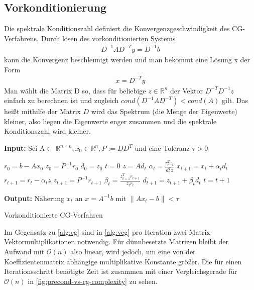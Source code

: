 \documentclass[12pt,a4paper]{scrartcl}
\numberwithin{equation}{section}
\numberwithin{myalgctr}{section}
\numberwithin{mytheoremctr}{subsection}
\numberwithin{mykorollarctr}{subsection}
\numberwithin{mylemmactr}{subsection}
\numberwithin{mybeispielctr}{subsection}
\newcommand\norm[1]{\left\lVert#1\right\rVert}
\begin{document}
	\subsection{Vorkonditionierung}
	Die spektrale Konditionszahl definiert die Konvergenzgeschwindigkeit des CG-Verfahrens. Durch lösen des vorkonditionierten Systems
	\begin{align*}
		D^{-1}AD^{-T}y = D^{-1}b
	\end{align*}
	kann die Konvergenz beschleunigt werden und man bekommt eine Lösung x der Form 
	\begin{align*}
		x = D^{-T}y
	\end{align*}
	Man wählt die Matrix D so, dass für beliebige $z \in \mathbb{R}^{n}$ der Vektor $D^{-T}D^{-1}z$ einfach zu berechnen ist und zugleich $cond(D^{-1}AD^{-T}) < cond(A)$ gilt. Das heißt mithilfe der Matrix $D$ wird das Spektrum (die Menge der Eigenwerte) kleiner, also liegen die Eigenwerte enger zusammen und die spektrale Konditionszahl wird kleiner. 
	\begin{algorithm}[H]
		\textbf{Input:} Sei A$\in$ $\mathbb{R}^{n\times n}, x_0 \in \mathbb{R}^{n}, P:=DD^{T}$ und eine Toleranz $\tau > 0$
		\begin{algorithmic}[1]
			\State $r_0 = b - Ax_0$
			\State $z_0 = P^{-1}r_0$
			\State $d_0 = z_0$
			\State $t = 0$
			\While{$ \norm{r_t} > \tau $}
			\State $z = Ad_t$
			\State $\alpha_t = \frac{r_t^{T}z_t}{d_t^{T}z}$
			\State $x_{t+1} = x_{t} + \alpha_t d_t$
			\State $r_{t+1} = r_t - \alpha_t z$
			\State $z_{t+1} = P^{-1}r_{t+1}$
			\State $\beta_t = \frac{z_{t+1}^{T}r_{t+1}}{z_tr_t}$
			\State $d_{t+1} = z_{t+1} + \beta_td_t$
			\State $t = t + 1$
			\EndWhile
		\end{algorithmic}
		\textbf{Output:} Näherung $x_t$ an $x = A^{-1}b$ mit $\norm{Ax_t-b} < \tau$
		
		\caption{Vorkonditionierte CG-Verfahren} \label{alg:vcg}
	\end{algorithm}

	Im Gegensatz zu \cref{alg:cg}  sind in \cref{alg:vcg} pro Iteration zwei Matrix-Vektormultiplikationen notwendig. F\"ur d\"unnbesetzte Matrizen bleibt der Aufwand mit $\mathcal{O}(n)$ also linear, wird jedoch, um eine  von der Koeffizientenmatrix abh\"angige multiplikative Konstante gr\"o\ss er. Die f\"ur einen Iterationsschritt ben\"otigte Zeit ist zusammen mit einer Vergleichsgerade f\"ur $\mathcal{O}(n)$ in \cref{fig:precond-vs-cg-complexity} zu sehen. 
	
\end{document}
